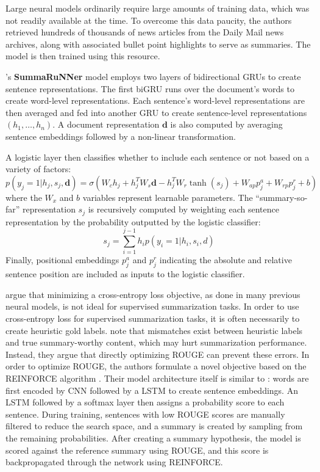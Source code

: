Large neural models ordinarily require large amounts of training data, which was not readily available at the time. To overcome this data paucity, the authors retrieved hundreds of thousands of news articles from the Daily Mail news archives, along with associated bullet point highlights to serve as summaries. The model is then trained using this resource.

\cite{ext5_summarunner}'s \textbf{SummaRuNNer} model employs two layers of bidirectional GRUs to create sentence representations. The first biGRU runs over the document's words to create word-level representations. Each sentence's word-level representations are then averaged and fed into another GRU to create sentence-level representations $(h_1,\dots,h_n)$. A document representation $\mathbf{d}$ is also computed by averaging sentence embeddings followed by a non-linear transformation.

A logistic layer then classifies whether to include each sentence or not based on a variety of factors:
\begin{equation}\label{eq:autoregressive-1}
    p(y_j = 1 | h_j, s_j, \mathbf{d}) = \sigma\left(W_c h_j + h_j^T W_s \mathbf{d} - h_j^T W_r \tanh{(s_j)} + W_{ap} p_j^a + W_{rp}p_j^r + b \right)
\end{equation}
where the $W_x$ and $b$ variables represent learnable parameters.
The ``summary-so-far'' representation $s_j$ is recursively computed by weighting each sentence representation by the probability outputted by the logistic classifier: 
\begin{equation}\label{eq:autoregressive-2}
    s_j = \sum_{i=1}^{j-1} h_i p(y_i = 1 | h_i, s_i, d)
\end{equation}
Finally, positional embeddings $p_j^a$ and $p_j^r$ indicating the absolute and relative sentence position are included as inputs to the logistic classifier.

\cite{DBLP:Narayan/2018} argue that minimizing a cross-entropy loss objective, as done in many previous neural models, is not ideal for supervised summarization tasks. In order to use cross-entropy loss for supervised summarization tasks, it is often necessarily to create heuristic gold labels. \cite{DBLP:Narayan/2018} note that mismatches exist between heuristic labels and true summary-worthy content, which may hurt summarization performance. Instead, they argue that directly optimizing ROUGE can prevent these errors. In order to optimize ROUGE, the authors formulate a novel objective based on the REINFORCE algorithm \parencite{williams1992simple}. Their model architecture itself is similar to \cite{cheng-lapata-2016-neural}: words are first encoded by CNN followed by a LSTM to create sentence embeddings. An LSTM followed by a softmax layer then assigns a probability score to each sentence. During training, sentences with low ROUGE scores are manually filtered to reduce the search space, and a summary is created by sampling from the remaining probabilities. After creating a summary hypothesis, the model is scored against the reference summary using ROUGE, and this score is backpropagated through the network using REINFORCE.

